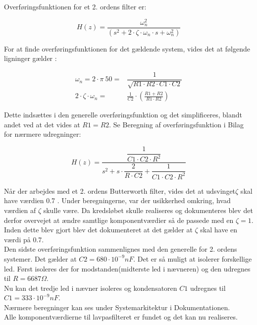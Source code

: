 Overføringsfunktionen for et 2. ordens filter er:
\begin{ceqn} 
\begin{equation}
H(z)=\frac{\omega_n^2}{(s^2 + 2\cdot\zeta \cdot \omega_n \cdot s+\omega_n^2)}
\end{equation}
\end{ceqn}

For at finde overføringsfunktionen for det gældende system, vides det at følgende ligninger gælder \cite{Wikilavpas}:
\begin{ceqn}
\begin{equation}
\begin{split}
\omega_n = 2\cdot \pi\ 50 =& \dfrac{1}{\sqrt{R1\cdot R2\cdot C1\cdot C2}}\\
2\cdot \zeta\cdot\omega_n =&\frac{1}{C2}\cdot \left( \frac{R1+R2}{R1\cdot R2}\right)
\end{split}
\end{equation}
\end{ceqn}
Dette indsættes i den generelle overføringsfunktion og det simplificeres, blandt andet ved at det vides at $ R1=R2 $. 
Se Beregning af overføringsfunktion i Bilag for nærmere udregninger:
\begin{ceqn} 
\begin{equation}
H(z)=\dfrac{\dfrac{1}{C1 \cdot C2\cdot R^2}}{s^2+s\cdot \dfrac{2}{R\cdot C2}+ \dfrac{1}{C1\cdot C2\cdot R^2}}
\end{equation}
\end{ceqn}
Når der arbejdes med et 2. ordens Butterworth filter, vides det at udsvinget$ \zeta $ skal have værdien 0.7 \cite{ASB}.
Under beregningerne, var der usikkerhed omkring, hvad værdien af $ \zeta $ skulle være. Da kredsløbet skulle realiseres og dokumenteres blev det derfor overvejet at ændre samtlige komponentværdier så de passede med en $ \zeta = 1 $. Inden dette blev gjort blev det dokumenteret at det gælder at $ \zeta $ skal have en værdi på 0.7. \\
  
Den sidste overføringsfunktion sammenlignes med den generelle for 2. ordens systemer. Det gælder at $ C2 = 680\cdot 10^{-9} nF $. Det er så muligt at isolerer forskellige led. Først isoleres der for modstanden(midterste led i nævneren) og den udregnes til $ R = 6687\Omega $. \\
Nu kan det tredje led i nævner isoleres og kondensatoren $ C1 $ udregnes til $ C1 = 333 \cdot 10^{-9} nF $. \\
Nærmere beregninger kan ses under Systemarkitektur i Dokumentationen. \\
Alle komponentværdierne til lavpasfilteret er fundet og det kan nu realiseres. \\ 

